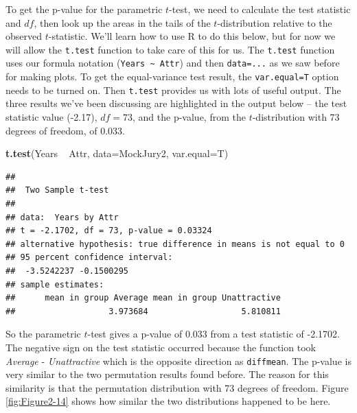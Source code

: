 \documentclass[]{book}
\newenvironment{Shaded}{\begin{snugshade}}{\end{snugshade}}
\newcommand{\KeywordTok}[1]{\textcolor[rgb]{0.13,0.29,0.53}{\textbf{{#1}}}}
\newcommand{\DataTypeTok}[1]{\textcolor[rgb]{0.13,0.29,0.53}{{#1}}}
\newcommand{\StringTok}[1]{\textcolor[rgb]{0.31,0.60,0.02}{{#1}}}
\newcommand{\NormalTok}[1]{{#1}}
\begin{document}
To get the p-value for the parametric \(t\)-test, we need to calculate
the test statistic and \(df\), then look up the areas in the tails of
the \(t\)-distribution relative to the observed \(t\)-statistic. We'll
learn how to use R to do this below, but for now we will allow the
\texttt{t.test} function to take care of this for us. The
\texttt{t.test} function uses our formula notation
(\texttt{Years\ \textasciitilde{}\ Attr}) and then \texttt{data=...} as
we saw before for making plots. To get the equal-variance test result,
the \texttt{var.equal=T} option needs to be turned on. Then
\texttt{t.test} provides us with lots of useful output. The three
results we've been discussing are highlighted in the output below -- the
test statistic value (-2.17), \(df=73\), and the p-value, from the
\(t\)-distribution with 73 degrees of freedom, of 0.033.

\begin{Shaded}
\begin{Highlighting}[]
\KeywordTok{t.test}\NormalTok{(Years ~}\StringTok{ }\NormalTok{Attr, }\DataTypeTok{data=}\NormalTok{MockJury2, }\DataTypeTok{var.equal=}\NormalTok{T)}
\end{Highlighting}
\end{Shaded}

\begin{verbatim}
## 
##  Two Sample t-test
## 
## data:  Years by Attr
## t = -2.1702, df = 73, p-value = 0.03324
## alternative hypothesis: true difference in means is not equal to 0
## 95 percent confidence interval:
##  -3.5242237 -0.1500295
## sample estimates:
##      mean in group Average mean in group Unattractive 
##                   3.973684                   5.810811
\end{verbatim}

So the parametric \(t\)-test gives a p-value of 0.033 from a test
statistic of -2.1702. The negative sign on the test statistic occurred
because the function took \emph{Average} - \emph{Unattractive} which is
the opposite direction as \texttt{diffmean}. The p-value is very similar
to the two permutation results found before. The reason for this
similarity is that the permutation distribution with 73 degrees of
freedom. Figure \ref{fig:Figure2-14} shows how similar the two
distributions happened to be here.
\end{document}
